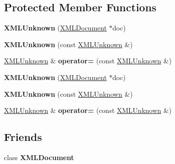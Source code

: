 \subsection*{Protected Member Functions}
\begin{DoxyCompactItemize}
\item 
\mbox{\label{classtinyxml2_1_1XMLUnknown_a9391eb679598d50baba424e6f1aa367b}} 
{\bfseries X\+M\+L\+Unknown} (\hyperlink{classtinyxml2_1_1XMLDocument}{X\+M\+L\+Document} $\ast$doc)
\item 
\mbox{\label{classtinyxml2_1_1XMLUnknown_aab31a93c95a7cedc9597cea7caffa73f}} 
{\bfseries X\+M\+L\+Unknown} (const \hyperlink{classtinyxml2_1_1XMLUnknown}{X\+M\+L\+Unknown} \&)
\item 
\mbox{\label{classtinyxml2_1_1XMLUnknown_a6137d5611db42c35de3d869f66555e5b}} 
\hyperlink{classtinyxml2_1_1XMLUnknown}{X\+M\+L\+Unknown} \& {\bfseries operator=} (const \hyperlink{classtinyxml2_1_1XMLUnknown}{X\+M\+L\+Unknown} \&)
\item 
\mbox{\label{classtinyxml2_1_1XMLUnknown_a9391eb679598d50baba424e6f1aa367b}} 
{\bfseries X\+M\+L\+Unknown} (\hyperlink{classtinyxml2_1_1XMLDocument}{X\+M\+L\+Document} $\ast$doc)
\item 
\mbox{\label{classtinyxml2_1_1XMLUnknown_aab31a93c95a7cedc9597cea7caffa73f}} 
{\bfseries X\+M\+L\+Unknown} (const \hyperlink{classtinyxml2_1_1XMLUnknown}{X\+M\+L\+Unknown} \&)
\item 
\mbox{\label{classtinyxml2_1_1XMLUnknown_a6137d5611db42c35de3d869f66555e5b}} 
\hyperlink{classtinyxml2_1_1XMLUnknown}{X\+M\+L\+Unknown} \& {\bfseries operator=} (const \hyperlink{classtinyxml2_1_1XMLUnknown}{X\+M\+L\+Unknown} \&)
\end{DoxyCompactItemize}
\subsection*{Friends}
\begin{DoxyCompactItemize}
\item 
\mbox{\label{classtinyxml2_1_1XMLUnknown_a0a577a5e971b59b321cae12e5b61df55}} 
class {\bfseries X\+M\+L\+Document}
\end{DoxyCompactItemize}
